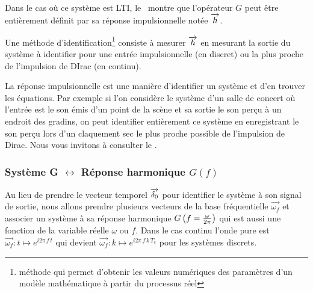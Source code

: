 Dans le cas où ce système est LTI, le~ montre que
l'opérateur $G$ peut être entièrement définit par sa réponse
impulsionnelle notée $\overrightarrow{h}$.



Une méthode d'identification\footnote{méthode qui permet d'obtenir les
  valeurs numériques des paramètres d'un modèle mathématique à partir
  du processus réel} consiste à mesurer $\overrightarrow{h}$ en mesurant la sortie du
système à identifier pour une entrée impulsionnelle (en discret) ou la
plus proche de l'impulsion de DIrac (en continu).

\begin{remarque}
  La réponse impulsionnelle est une manière d'identifier un système et
  d'en trouver les équations. Par exemple si l'on considère le système
  d'un salle de concert où l'entrée est le son émis d'un point de la
  scène et sa sortie le son perçu à un endroit des gradins, on peut
  identifier entièrement ce système en enregistrant le son perçu lors
  d'un claquement sec le plus proche possible de l'impulsion de
  Dirac. Nous vous invitons à consulter le .
\end{remarque}

\subsubsection{Système G $\leftrightarrow$ Réponse harmonique $G(f)$}

\def\wf{\vec{\omega_f}}
Au lieu de prendre le vecteur temporel $\d0$ pour identifier le
système à son signal de sortie, nous allons prendre plusieurs vecteurs
de la base fréquentielle $\wf$ et associer un système à sa
réponse harmonique $G\left(f=\frac{\omega}{2\pi}\right)$ qui est aussi une
fonction de la variable réelle $\omega$ ou $f$. Dans le cas continu
l'onde pure est $\wf :t\mapsto e^{i2\pi\,f\,t}$ qui devient
$\wf :k\mapsto e^{i2\pi\,f\,k\,T_e}$ pour les systèmes
discrets.

